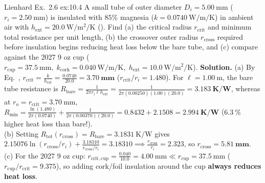 \begin{workedexample}{Lienhard Ex.\ 2.6 }{ex:10.4}
A small tube of outer diameter $D_i = \SI{5.00}{\milli\meter}$ ($r_i = \SI{2.50}{\milli\meter}$) is insulated with $85\%$ magnesia ($k = \SI{0.0740}{\watt\per\meter\per\kelvin}$) in ambient air with $h_{\mathrm{ext}} = \SI{20.0}{\watt\per\square\meter\per\kelvin}$ (). Find (a) the critical radius $r_{\mathrm{crit}}$ and minimum total resistance per unit length, (b) the crossover outer radius $r_{\mathrm{cross}}$ required before insulation begins reducing heat loss below the bare tube, and (c) compare against the 2027 9 oz cup ($r_{\mathrm{cup}} = \SI{37.5}{\milli\meter},\; k_{\mathrm{cork}} = \SI{0.040}{\watt\per\meter\per\kelvin},\; h_{\mathrm{ext}} = \SI{10.0}{\watt\per\square\meter\per\kelvin}$).
\tcblower
\textbf{Solution.} (a) By Eq.~, $r_{\mathrm{crit}} = \frac{k}{h_{\mathrm{ext}}} = \frac{0.0740}{20.0} = \mathbf{\SI{3.70}{\milli\meter}}$ ($r_{\mathrm{crit}}/r_i = 1.480$). For $\ell = \SI{1.00}{\meter}$, the bare tube resistance is $R_{\mathrm{bare}} = \frac{1}{2\pi r_i \ell h_{\mathrm{ext}}} = \frac{1}{2\pi(0.00250)(1.00)(20.0)} = \mathbf{\SI{3.183}{\kelvin\per\watt}}$, whereas at $r_o = r_{\mathrm{crit}} = \SI{3.70}{\milli\meter}$, $R_{\min} = \frac{\ln(1.480)}{2\pi(0.0740)} + \frac{1}{2\pi(0.00370)(20.0)} = 0.8432 + 2.1508 = \mathbf{\SI{2.994}{\kelvin\per\watt}}$ ($\SI{6.3}{\percent}$ higher heat loss than bare!).\\
(b) Setting $R_{\mathrm{tot}}(r_{\mathrm{cross}}) = R_{\mathrm{bare}} = \SI{3.1831}{\kelvin\per\watt}$ gives $2.15076\ln(r_{\mathrm{cross}}/r_i) + \frac{3.18310}{r_{\mathrm{cross}}/r_i} = 3.18310 \implies \frac{r_{\mathrm{cross}}}{r_i} = \mathbf{2.323}$, so $r_{\mathrm{cross}} = \mathbf{\SI{5.81}{\milli\meter}}$.\\
(c) For the 2027 9 oz cup: $r_{\mathrm{crit,cup}} = \frac{0.040}{10.0} = \SI{4.00}{\milli\meter} \ll r_{\mathrm{cup}} = \SI{37.5}{\milli\meter}$ ($r_{\mathrm{cup}}/r_{\mathrm{crit}} = 9.375$), so adding cork/foil insulation around the cup \textbf{always reduces heat loss}.
\end{workedexample}

